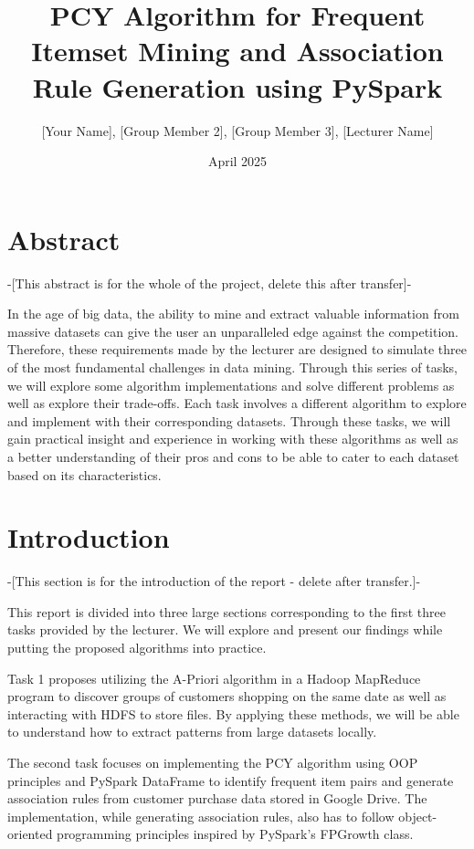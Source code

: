 \documentclass{article}
\title{PCY Algorithm for Frequent Itemset Mining and Association Rule Generation using PySpark}
\author{[Your Name], [Group Member 2], [Group Member 3], [Lecturer Name]}
\date{April 2025}
\begin{document}
\maketitle

\section{Abstract}
-[This abstract is for the whole of the project, delete this after transfer]-

In the age of big data, the ability to mine and extract valuable information from massive datasets can give the user an unparalleled edge against the competition. Therefore, these requirements made by the lecturer are designed to simulate three of the most fundamental challenges in data mining. Through this series of tasks, we will explore some algorithm implementations and solve different problems as well as explore their trade-offs. Each task involves a different algorithm to explore and implement with their corresponding datasets. Through these tasks, we will gain practical insight and experience in working with these algorithms as well as a better understanding of their pros and cons to be able to cater to each dataset based on its characteristics.

\section{Introduction}
-[This section is for the introduction of the report - delete after transfer.]-

This report is divided into three large sections corresponding to the first three tasks provided by the lecturer. We will explore and present our findings while putting the proposed algorithms into practice.

Task 1 proposes utilizing the A-Priori algorithm in a Hadoop MapReduce program to discover groups of customers shopping on the same date as well as interacting with HDFS to store files. By applying these methods, we will be able to understand how to extract patterns from large datasets locally.

The second task focuses on implementing the PCY algorithm using OOP principles and PySpark DataFrame to identify frequent item pairs and generate association rules from customer purchase data stored in Google Drive. The implementation, while generating association rules, also has to follow object-oriented programming principles inspired by PySpark's FPGrowth class.
\end{document}
